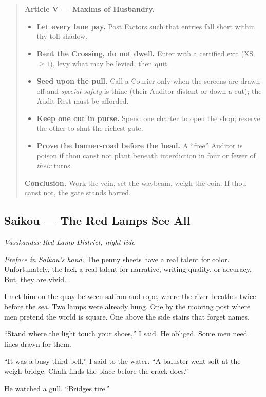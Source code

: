 \documentclass[11pt]{article}
\begin{document}
\begin{quote}
\textbf{Article V — Maxims of Husbandry.}
\begin{itemize}\itemsep0.25em
  \item \textbf{Let every lane pay.} Post Factors such that entries fall short within thy toll-shadow.
  \item \textbf{Rent the Crossing, do not dwell.} Enter with a certified exit (XS $\ge 1$), levy what may be levied, then quit.
  \item \textbf{Seed upon the pull.} Call a Courier only when the screens are drawn off and \emph{special-safety} is thine (their Auditor distant or down a cut); the Audit Rest must be afforded.
  \item \textbf{Keep one cut in purse.} Spend one charter to open the shop; reserve the other to shut the richest gate.
  \item \textbf{Prove the banner-road before the head.} A “free” Auditor is poison if thou canst not plant beneath interdiction in four or fewer of \emph{their} turns.
\end{itemize}

\medskip
\textbf{Conclusion.} Work the vein, set the waybeam, weigh the coin. If thou canst not, the gate stands barred.
\end{quote}

\clearpage

\subsection{Saikou — The Red Lamps See All}

\noindent\textit{Vasskandar Red Lamp District, night tide}

\medskip
\noindent\textit{Preface in Saikou's hand.} The penny sheets have a real talent for color. Unfortunately, the lack a real talent for narrative, writing quality, or accuracy. But, they are vivid...

\medskip
I met him on the quay between saffron and rope, where the river breathes twice before the sea. Two lamps were already hung. One by the mooring post where men pretend the world is square. One above the side stairs that forget names.

``Stand where the light touch your shoes,'' I said. He obliged. Some men need lines drawn for them.

``It was a busy third bell,'' I said to the water. ``A baluster went soft at the weigh-bridge. Chalk finds the place before the crack does.''

He watched a gull. ``Bridges tire.''
\end{document}

